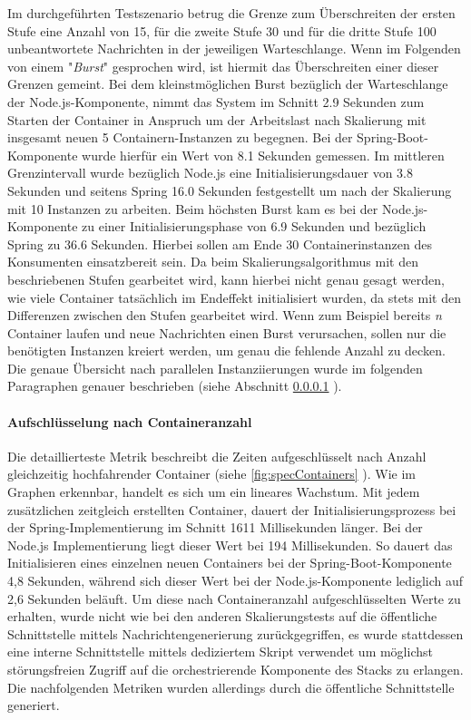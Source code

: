 Im durchgeführten Testszenario betrug die Grenze zum Überschreiten der ersten Stufe eine Anzahl von 15, für die zweite Stufe 30 und für die dritte Stufe 100 unbeantwortete Nachrichten in der jeweiligen Warteschlange. Wenn im Folgenden von einem "\emph{Burst}" gesprochen wird, ist hiermit das Überschreiten einer dieser Grenzen gemeint. Bei dem kleinstmöglichen Burst bezüglich der Warteschlange der Node.js-Komponente, nimmt das System im Schnitt 2.9 Sekunden zum Starten der Container in Anspruch um der Arbeitslast nach Skalierung mit insgesamt neuen 5 Containern-Instanzen zu begegnen. Bei der Spring-Boot-Komponente wurde hierfür ein Wert von 8.1 Sekunden gemessen. Im mittleren Grenzintervall wurde bezüglich Node.js eine Initialisierungsdauer von 3.8 Sekunden und seitens Spring 16.0 Sekunden festgestellt um nach der Skalierung mit 10 Instanzen zu arbeiten. Beim höchsten Burst kam es bei der Node.js-Komponente zu einer Initialisierungsphase von 6.9 Sekunden und bezüglich Spring zu 36.6 Sekunden. Hierbei sollen am Ende 30 Containerinstanzen des Konsumenten einsatzbereit sein. Da beim Skalierungsalgorithmus mit den beschriebenen Stufen gearbeitet wird, kann hierbei nicht genau gesagt werden, wie viele Container tatsächlich im Endeffekt initialisiert wurden, da stets mit den Differenzen zwischen den Stufen gearbeitet wird. Wenn zum Beispiel bereits \emph{n} Container laufen und neue Nachrichten einen Burst verursachen, sollen nur die benötigten Instanzen kreiert werden, um genau die fehlende Anzahl zu decken. Die genaue Übersicht nach parallelen Instanziierungen wurde im folgenden Paragraphen genauer beschrieben (siehe Abschnitt \ref{par:specContainer} ).


\paragraph{Aufschlüsselung nach Containeranzahl}
\label{par:specContainer}
Die detaillierteste Metrik beschreibt die Zeiten aufgeschlüsselt nach Anzahl gleichzeitig hochfahrender Container (siehe \ref{fig:specContainers} ). Wie im Graphen erkennbar, handelt es sich um ein lineares Wachstum. Mit jedem zusätzlichen zeitgleich erstellten Container, dauert der Initialisierungsprozess bei der Spring-Implementierung im Schnitt 1611 Millisekunden länger. Bei der Node.js Implementierung liegt dieser Wert bei 194 Millisekunden. So dauert das Initialisieren eines einzelnen neuen Containers bei der Spring-Boot-Komponente 4,8 Sekunden, während sich dieser Wert bei der Node.js-Komponente lediglich auf 2,6 Sekunden beläuft. Um diese nach Containeranzahl aufgeschlüsselten Werte zu erhalten, wurde nicht wie bei den anderen Skalierungstests auf die öffentliche Schnittstelle mittels Nachrichtengenerierung zurückgegriffen, es wurde stattdessen eine interne Schnittstelle mittels dediziertem Skript verwendet um möglichst störungsfreien Zugriff auf die orchestrierende Komponente des Stacks zu erlangen. Die nachfolgenden Metriken wurden allerdings durch die öffentliche Schnittstelle generiert.

